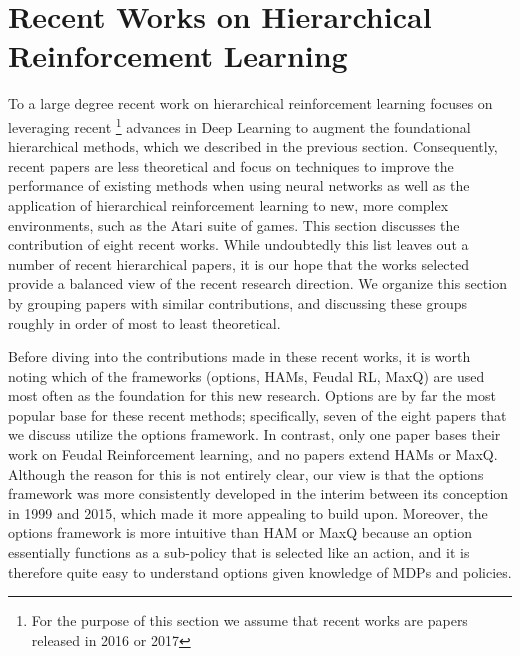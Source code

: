 \section{Recent Works on Hierarchical Reinforcement Learning}

To a large degree recent work on hierarchical reinforcement learning focuses on leveraging recent
\footnote{For the purpose of this section we assume that recent works are papers released in 2016 or 2017}
advances in Deep Learning to augment the foundational hierarchical methods, which we described in the previous section.
Consequently, recent papers are less theoretical and focus on techniques to improve the performance
of existing methods when using neural networks as well as the application of hierarchical reinforcement learning
to new, more complex environments, such as the Atari suite of games.
This section discusses the contribution of eight recent works. While undoubtedly this list leaves out a number
of recent hierarchical papers, it is our hope that the works selected provide a balanced view of the recent
research direction. We organize this section by grouping papers with similar contributions, and discussing
these groups roughly in order of most to least theoretical.

Before diving into the contributions made in these recent works, it is worth noting which of the frameworks
(options, HAMs, Feudal RL, MaxQ) are used most often as the foundation for this new research.
Options are by far the most popular base for these recent methods; specifically, seven of the eight
papers that we discuss utilize the options framework. In contrast, only one paper bases their work
on Feudal Reinforcement learning, and no papers extend HAMs or MaxQ. Although the reason for this is
not entirely clear, our view is that the options framework was more consistently developed in the interim
between its conception in 1999 and 2015, which made it more appealing to build upon. Moreover, the options
framework is more intuitive than HAM or MaxQ because an option essentially functions as a sub-policy that is
selected like an action, and it is therefore quite easy to understand options given knowledge of MDPs and policies.

